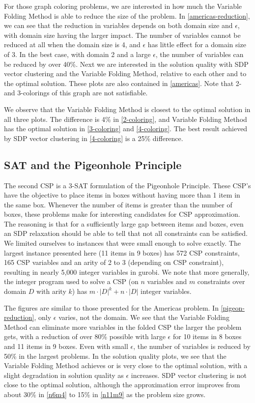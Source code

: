 \documentclass[12pt]{article} %
\begin{document}
For those graph coloring problems, we are interested in how much the Variable Folding Method is able to reduce the size of the problem. In \autoref{americas-reduction}, we can see that the reduction in variables depends on both domain size and $\epsilon$, with domain size having the larger impact. The number of variables cannot be reduced at all when the domain size is 4, and $\epsilon$ has little effect for a domain size of 3. In the best case, with domain 2 and a large $\epsilon$, the number of variables can be reduced by over 40\%. Next we are interested in the solution quality with SDP vector clustering and the Variable Folding Method, relative to each other and to the optimal solution. These plots are also contained in \autoref{americas}. Note that 2- and 3-colorings of this graph are not satisfiable.

We observe that the Variable Folding Method is closest to the optimal solution in all three plots. The difference is 4\% in \ref{2-coloring}, and Variable Folding Method has the optimal solution in \ref{3-coloring} and \ref{4-coloring}. The best result achieved by SDP vector clustering in \ref{4-coloring} is a 25\% difference.

\FloatBarrier
\subsection{SAT and the Pigeonhole Principle}

The second CSP is a 3-SAT formulation of the Pigeonhole Principle. These CSP's have the objective to place items in boxes without having more than 1 item in the same box. Whenever the number of items is greater than the number of boxes, these problems make for interesting candidates for CSP approximation. The reasoning is that for a sufficiently large gap between items and boxes, even an SDP relaxation should be able to tell that not all constraints can be satisfied. We limited ourselves to instances that were small enough to solve exactly. The largest instance presented here (11 items in 9 boxes) has 572 CSP constraints, 165 CSP variables and an arity of 2 to 3 (depending on CSP constraint), resulting in nearly 5,000 integer variables in gurobi. We note that more generally, the integer program used to solve a CSP (on $n$ variables and $m$ constraints over domain $D$ with arity $k$) has $m \cdot |D|^k + n \cdot |D|$ integer variables.

 The figures are similar to those presented for the Americas problem. In \autoref{pigeon-reduction}, only $\epsilon$ varies, not the domain. We see that the Variable Folding Method can eliminate more variables in the folded CSP the larger the problem gets, with a reduction of over 80\% possible with large $\epsilon$ for 10 items in 8 boxes and 11 items in 9 boxes. Even with small $\epsilon$, the number of variables is reduced by 50\% in the largest problems. In the solution quality plots, we see that the Variable Folding Method achieves or is very close to the optimal solution, with a slight degradation in solution quality as $\epsilon$ increases. SDP vector clustering is not close to the optimal solution, although the approximation error improves from about 30\% in \ref{n6m4} to 15\% in \ref{n11m9} as the problem size grows.
\end{document}
